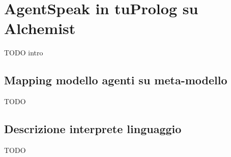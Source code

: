 \chapter{AgentSpeak in tuProlog su Alchemist}
TODO intro

\section{Mapping modello agenti su meta-modello}
TODO

\section{Descrizione interprete linguaggio}
TODO



